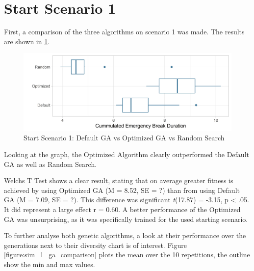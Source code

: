 \section{Start Scenario 1}
First, a comparison of the three algorithms on scenario 1 was made. The results are shown in \ref{figure:sim_1_comparison}.

\begin{figure}[ht] 
	\label{figure:sim_1_comparison}
	\includegraphics[width=1\linewidth]{simulations/evaluation/plots/sim_1_comparison}
	\caption{Start Scenario 1: Default GA vs Optimized GA vs Random Search}
\end{figure}

Looking at the graph, the Optimized Algorithm clearly outperformed the Default GA as well as Random Search.

Welchs T Test shows a clear result, stating that on average greater fitness is achieved by using Optimized GA (M = 8.52, SE = ?) than from using Default GA (M = 7.09, SE = ?). This difference was significant \textit{t}(17.87) = -3.15, p < .05. It did represent a large effect r = 0.60.
A better performance of the Optimized GA was unsurprising, as it was specifically trained for the used starting scenario.


To further analyse both genetic algorithms, a look at their performance over the generations next to their diversity chart is of interest. Figure \ref{figure:sim_1_ga_comparison} plots the mean over the 10 repetitions, the outline show the min and max values.

